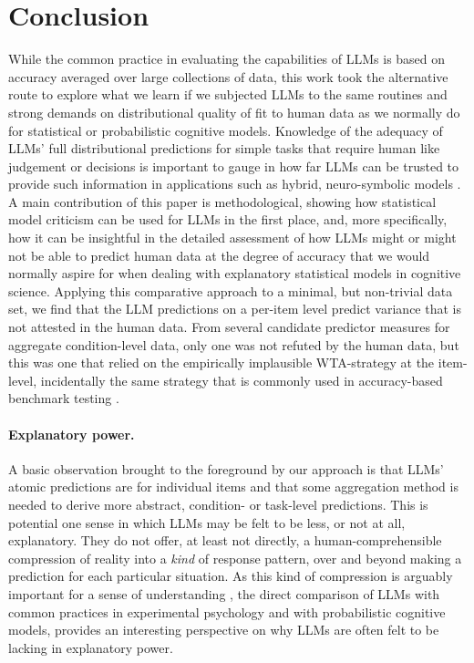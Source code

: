\documentclass[fleqn]{article}
\begin{document}
\section{Conclusion}
\label{sec:conclusion}

While the common practice in evaluating the capabilities of LLMs is based on accuracy averaged over large collections of data, this work took the alternative route to explore what we learn if we subjected LLMs to the same routines and strong demands on distributional quality of fit to human data as we normally do for statistical or probabilistic cognitive models.
Knowledge of the adequacy of LLMs' full distributional predictions for simple tasks that require human like judgement or decisions is important to gauge in how far LLMs can be trusted to provide such information in applications such as hybrid, neuro-symbolic models .
A main contribution of this paper is methodological, showing how statistical model criticism can be used for LLMs in the first place, and, more specifically, how it can be insightful in the detailed assessment of how LLMs might or might not be able to predict human data at the degree of accuracy that we would normally aspire for when dealing with explanatory statistical models in cognitive science.
Applying this comparative approach to a minimal, but non-trivial data set, we find that the LLM predictions on a per-item level predict variance that is not attested in the human data.
From several candidate predictor measures for aggregate condition-level data, only one was not refuted by the human data, but this was one that relied on the empirically implausible WTA-strategy at the item-level, incidentally the same strategy that is commonly used in accuracy-based benchmark testing \citep{srivastava2023-BIGbench}.

\paragraph{Explanatory power.}
A basic observation brought to the foreground by our approach is that LLMs' atomic predictions are for individual items and that some aggregation method is needed to derive more abstract, condition- or task-level predictions.
This is potential one sense in which LLMs may be felt to be less, or not at all, explanatory.
They do not offer, at least not directly, a human-comprehensible compression of reality into a \emph{kind} of response pattern, over and beyond making a prediction for each particular situation.
As this kind of compression is arguably important for a sense of understanding \citep{Dellsen2020:Beyond-Explanat,Grimm2021:Understanding}, the direct comparison of LLMs with common practices in experimental psychology and with probabilistic cognitive models, provides an interesting perspective on why LLMs are often felt to be lacking in explanatory power.
\end{document}
